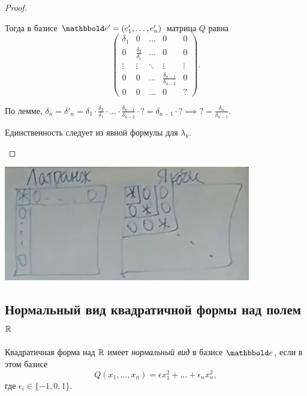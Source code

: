 \begin{proof}
\begin{description}
        Тогда в базисе $\E' = (e'_1, \dots, e'_n)$ матрица $Q$ равна
        \begin{equation*}
            \begin{pmatrix} 
                \delta_1 & 0 & \dots & 0 & 0 \\
                0 & \frac{\delta_2}{\delta_1} & \dots & 0 & 0 \\
                \vdots & \vdots & \ddots & \vdots & \vdots \\
                0 & 0 & \dots & \frac{\delta_{n - 1}}{\delta_{n - 2}} & 0 \\
                0 & 0 & \dots & 0 & ?
            \end{pmatrix}
        .\end{equation*}

        По лемме, $\delta_n = \delta'_n = \delta_1 \cdot \frac{\delta_2}{\delta_1} \cdot \dots \cdot \frac{\delta_{n - 1}}{\delta_{n - 2}} \cdot ? = \delta_{n - 1} \cdot ? \implies ? = \frac{\delta_n}{\delta_{n - 1}}$.

        Единственность следует из явной формулы для $\lambda_k$.
        \qedhere
    \end{description}
\end{proof}

\begin{center}
    \includegraphics[height=5cm]{lecture20_matrix}
\end{center}


\subsection{Нормальный вид квадратичной формы над полем $\mathbb{R}$}

\begin{definition}
    Квадратичная форма над $\mathbb{R}$ имеет \textit{нормальный вид} в базисе $\E$, если в этом базисе
    \begin{equation*}
        Q(x_1, \dots, x_n) = \epsilon x_1^2 + \dots + \epsilon_n x_n^2
    ,\end{equation*}
    где $\epsilon_i \in \{-1, 0, 1\}$.
\end{definition}


